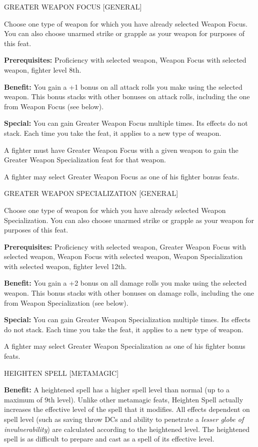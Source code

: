 \documentclass{article}
\begin{document}
\vspace{12pt}
GREATER WEAPON FOCUS [GENERAL]

Choose one type of weapon for which you have already selected Weapon Focus. You 
can also choose unarmed strike or grapple as your weapon for purposes of this feat. 

\parindent=3pt
\textbf{Prerequisites:} Proficiency with selected weapon, Weapon Focus with selected 
weapon, fighter level 8th.

\parindent=0pt
\textbf{Benefit:} You gain a +1 bonus on all attack rolls you make using the selected 
weapon. This bonus stacks with other bonuses on attack rolls, including the one 
from Weapon Focus (see below).

\textbf{Special:} You can gain Greater Weapon Focus multiple times. Its effects 
do not stack. Each time you take the feat, it applies to a new type of weapon.

A fighter must have Greater Weapon Focus with a given weapon to gain the Greater 
Weapon Specialization feat for that weapon. 

A fighter may select Greater Weapon Focus as one of his fighter bonus feats.

\vspace{12pt}
GREATER WEAPON SPECIALIZATION [GENERAL]

Choose one type of weapon for which you have already selected Weapon Specialization. 
You can also choose unarmed strike or grapple as your weapon for purposes of this 
feat. 

\parindent=3pt
\textbf{Prerequisites:} Proficiency with selected weapon, Greater Weapon Focus 
with selected weapon, Weapon Focus with selected weapon, Weapon Specialization 
with selected weapon, fighter level 12th.

\parindent=0pt
\textbf{Benefit:} You gain a +2 bonus on all damage rolls you make using the selected 
weapon. This bonus stacks with other bonuses on damage rolls, including the one 
from Weapon Specialization (see below).

\textbf{Special:} You can gain Greater Weapon Specialization multiple times. Its 
effects do not stack. Each time you take the feat, it applies to a new type of 
weapon.

A fighter may select Greater Weapon Specialization as one of his fighter bonus 
feats.

\vspace{12pt}
HEIGHTEN SPELL [METAMAGIC]

\textbf{Benefit:} A heightened spell has a higher spell level than normal (up to 
a maximum of 9th level). Unlike other metamagic feats, Heighten Spell actually 
increases the effective level of the spell that it modifies. All effects dependent 
on spell level (such as saving throw DCs and ability to penetrate a \textit{lesser 
globe of invulnerability}) are calculated according to the heightened level. The 
heightened spell is as difficult to prepare and cast as a spell of its effective 
level. 
\end{document}
